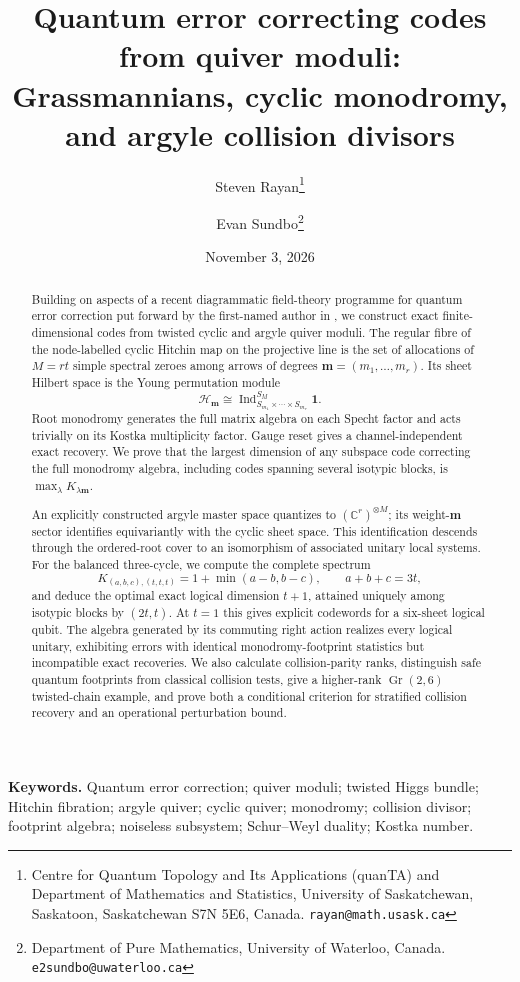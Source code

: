 \documentclass[11pt]{article}
\title{\textbf{Quantum error correcting codes from quiver moduli: Grassmannians, cyclic monodromy, and argyle collision divisors}}
\author{
Steven Rayan\thanks{Centre for Quantum Topology and Its Applications (quanTA) and Department of Mathematics and Statistics, University of Saskatchewan, Saskatoon, Saskatchewan S7N 5E6, Canada. \texttt{rayan@math.usask.ca}}
\and
Evan Sundbo\thanks{Department of Pure Mathematics, University of Waterloo, Canada. \texttt{e2sundbo@uwaterloo.ca}}
}
\date{November 3, 2026}
\theoremstyle{definition}
\theoremstyle{remark}
\newcommand{\C}{\mathbb C}
\newcommand{\cH}{\mathcal H}
\newcommand{\Gr}{\operatorname{Gr}}
\newcommand{\Ind}{\operatorname{Ind}}
\begin{document}
\maketitle

\begin{abstract}
Building on aspects of a recent diagrammatic field-theory programme for quantum error correction put forward by the first-named author in \cite{RayanDiagrammatic2026}, we construct exact finite-dimensional codes from twisted cyclic and argyle quiver moduli.  The regular fibre of the node-labelled cyclic Hitchin map on the projective line is the set of allocations of $M=rt$ simple spectral zeroes among arrows of degrees $\boldsymbol m=(m_1,\ldots,m_r)$.  Its sheet Hilbert space is the Young permutation module
\[
 \cH_{\boldsymbol m}\cong
 \Ind_{S_{m_1}\times\cdots\times S_{m_r}}^{S_M}\mathbf1.
\]
Root monodromy generates the full matrix algebra on each Specht factor and acts trivially on its Kostka multiplicity factor.  Gauge reset gives a channel-independent exact recovery.  We prove that the largest dimension of any subspace code correcting the full monodromy algebra, including codes spanning several isotypic blocks, is $\max_\lambda K_{\lambda\boldsymbol m}$.

An explicitly constructed argyle master space quantizes to $(\C^r)^{\otimes M}$; its weight-$\boldsymbol m$ sector identifies equivariantly with the cyclic sheet space.  This identification descends through the ordered-root cover to an isomorphism of associated unitary local systems.  For the balanced three-cycle, we compute the complete spectrum
\[
 K_{(a,b,c),(t,t,t)}=1+\min(a-b,b-c),
 \qquad a+b+c=3t,
\]
and deduce the optimal exact logical dimension $t+1$, attained uniquely among isotypic blocks by $(2t,t)$.  At $t=1$ this gives explicit codewords for a six-sheet logical qubit.  The algebra generated by its commuting right action realizes every logical unitary, exhibiting errors with identical monodromy-footprint statistics but incompatible exact recoveries.  We also calculate collision-parity ranks, distinguish safe quantum footprints from classical collision tests, give a higher-rank $\Gr(2,6)$ twisted-chain example, and prove both a conditional criterion for stratified collision recovery and an operational perturbation bound.
\end{abstract}

\medskip
\noindent\textbf{Keywords.}
Quantum error correction; quiver moduli; twisted Higgs bundle; Hitchin fibration; argyle quiver; cyclic quiver; monodromy; collision divisor; footprint algebra; noiseless subsystem; Schur--Weyl duality; Kostka number.
\end{document}
